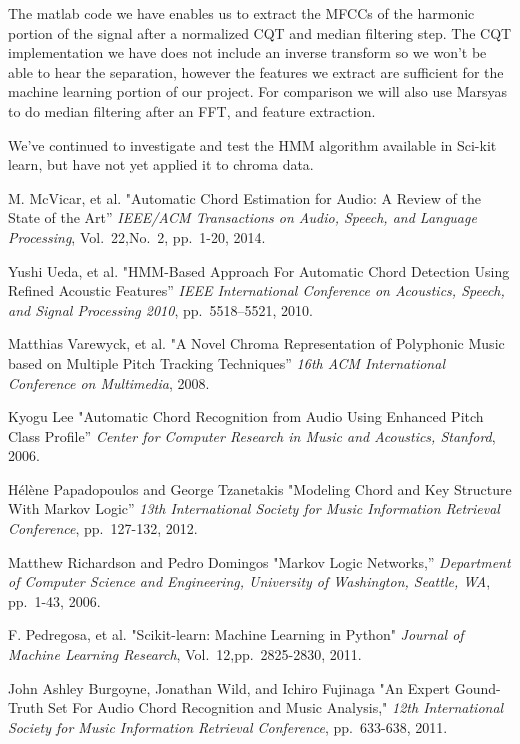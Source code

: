 \documentclass{article}
\begin{document}
The matlab code we have enables us to extract the MFCCs of the harmonic portion
of the signal after a normalized CQT and median filtering step. The CQT
implementation we have does not include an inverse transform so we won't be
able to hear the separation, however the features we extract are sufficient for
the machine learning portion of our project. For comparison we will also use
Marsyas to do median filtering after an FFT, and feature extraction.

We've continued to investigate and test the HMM algorithm available in Sci-kit
learn, but have not yet applied it to chroma data.

\begin{thebibliography}{citations}

M. McVicar, et al.
"Automatic Chord Estimation for Audio: A Review of the State of the Art''
{\it IEEE/ACM Transactions on Audio, Speech, and Language Processing},
Vol.~22,No.~2, pp.~1-20, 2014.

Yushi Ueda, et al.
"HMM-Based Approach For Automatic Chord Detection Using Refined Acoustic
Features''
{\it IEEE International Conference on Acoustics, Speech, and Signal Processing 2010},
pp.~5518--5521, 2010.

Matthias Varewyck, et al.
"A Novel Chroma Representation of Polyphonic Music based on Multiple Pitch
Tracking Techniques''
{\it 16th ACM International Conference on Multimedia},
2008.

Kyogu Lee
"Automatic Chord Recognition from Audio Using Enhanced Pitch Class Profile''
{\it Center for Computer Research in Music and Acoustics, Stanford},
2006.

Hélène Papadopoulos and George Tzanetakis
"Modeling Chord and Key Structure With Markov Logic''
{\it 13th International Society for Music Information Retrieval Conference},
pp.~127-132, 2012.

Matthew Richardson and Pedro Domingos
"Markov Logic Networks,''
{\it Department of Computer Science and Engineering, University of Washington, Seattle, WA},
pp.~1-43, 2006.

F. Pedregosa, et al.
"Scikit-learn: Machine Learning in Python"
{\it Journal of Machine Learning Research},
Vol.~12,pp.~2825-2830, 2011.

John Ashley Burgoyne, Jonathan Wild, and Ichiro Fujinaga
"An Expert Gound-Truth Set For Audio Chord Recognition and Music Analysis,"
{\it 12th International Society for Music Information Retrieval Conference},
pp.~633-638, 2011.


\end{thebibliography}
\end{document}
